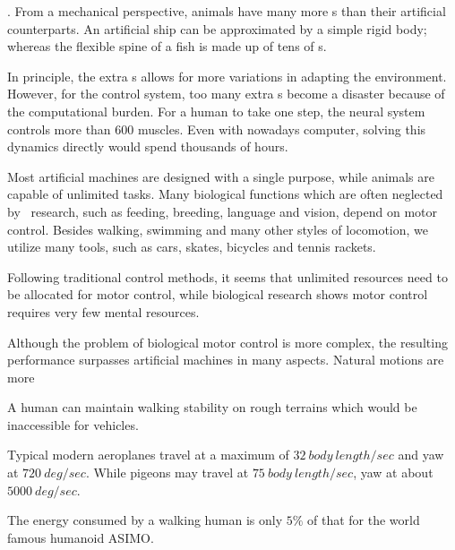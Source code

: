 \begin{itemize}
.
From a mechanical perspective, animals have many more {\dof}s than their artificial counterparts.
An artificial ship can be approximated by a simple rigid body; whereas the flexible spine of a fish is made up of tens of {\dof}s.


In principle, the extra {\dof}s allows for more variations in adapting the environment. 
However, for the control system, too many extra {\dof}s become a disaster because of the computational burden. 
For a human to take one step,  the neural system controls more than $600$ muscles.
Even with nowadays computer, solving this dynamics directly would spend thousands of hours.

 
Most artificial machines are designed with a single purpose, while animals are capable  of unlimited tasks.
Many biological functions which are often neglected by \cms\ research, such as feeding, breeding, language and vision, depend on motor control. 
Besides walking, swimming and many other styles of locomotion, we utilize many tools, such as cars, skates, bicycles and tennis rackets.

Following traditional control methods, it seems that unlimited resources need to be  allocated for motor control, while biological research shows motor control requires very few mental resources.

Although the problem of biological motor control is more complex, the resulting performance surpasses artificial machines in many aspects.
Natural motions are more
\begin{enumerate} 

A human can maintain walking stability on rough terrains which would be inaccessible for vehicles.

Typical modern aeroplanes  travel at a maximum of $32\: body\: length/sec$ and yaw at $720\: deg/sec$.
While pigeons may travel at $75 \:body\: length / sec$, yaw at about  $5000 \: deg/sec$.

The energy consumed by a walking human  is only $5\%$ of that for the world famous humanoid ASIMO.
\end{enumerate}

\end{itemize}



